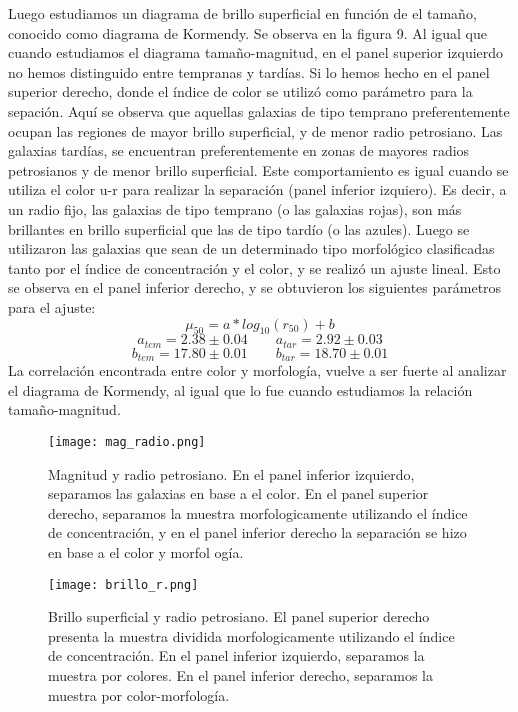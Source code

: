 \documentclass[a4paper,10pt]{article}
\begin{document}
Luego estudiamos un diagrama de brillo superficial en funci\'on de el tama\~no, conocido como diagrama de Kormendy. Se observa en la figura 9.
Al igual que cuando estudiamos el diagrama tama\~no-magnitud, en el panel superior izquierdo no hemos distinguido entre tempranas y tard\'ias. Si lo hemos hecho en el panel superior derecho, donde el \'indice de color se utiliz\'o como par\'ametro para la sepaci\'on. Aqu\'i se observa que aquellas galaxias de tipo temprano preferentemente ocupan las regiones de mayor brillo superficial, y de menor radio petrosiano. Las galaxias tard\'ias, se encuentran preferentemente en zonas de mayores radios petrosianos y de menor brillo superficial. Este comportamiento es igual cuando se utiliza el color u-r para realizar la separaci\'on (panel inferior izquiero).
Es decir, a un radio fijo, las galaxias de tipo temprano (o las galaxias rojas), son m\'as brillantes en brillo superficial que las de tipo tard\'io (o las azules).
Luego se utilizaron las galaxias que sean de un determinado tipo morfol\'ogico clasificadas tanto por el \'indice de concentraci\'on y el color, y se realiz\'o un ajuste lineal. Esto se observa en el panel inferior derecho, y se obtuvieron los siguientes par\'ametros para el ajuste:
\begin{equation}
 \mu_{50}=a*log_{10}(r_{50})+b
\end{equation}
$$
a_{tem}=2.38 \pm 0.04  \qquad a_{tar}=2.92 \pm 0.03
$$
$$
 b_{tem}=17.80 \pm 0.01 \qquad b_{tar}=18.70 \pm 0.01
$$
La correlaci\'on encontrada entre color y morfolog\'ia, vuelve a ser fuerte al analizar el diagrama de Kormendy, al igual que lo fue cuando estudiamos la relaci\'on tama\~no-magnitud.

\begin{figure}[h]
 \centering
 \texttt{[image: mag\_radio.png]}
 \caption{Magnitud y radio petrosiano. En el panel inferior izquierdo, separamos las galaxias en base a el color. En el panel superior derecho, separamos la muestra morfologicamente utilizando el \'indice de concentraci\'on, y en el panel inferior derecho la separaci\'on se hizo en base a el color y morfol og\'ia.}
 \label{fig: 9}
\end{figure}

\begin{figure}[h]
 \centering
 \texttt{[image: brillo\_r.png]}
 \caption{Brillo superficial y radio petrosiano. El panel superior derecho presenta la muestra dividida morfologicamente utilizando el \'indice de concentraci\'on. En el panel inferior izquierdo, separamos la muestra por colores. En el panel inferior derecho, separamos la muestra por color-morfolog\'ia.}
 \label{fig:10}
\end{figure}
\end{document}

